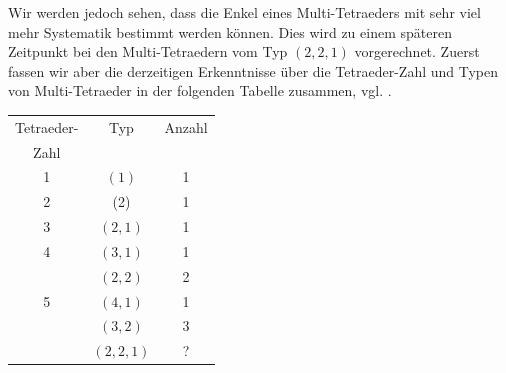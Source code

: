 \documentclass[12pt,titlepage,twoside,cleardoublepage]{article}
\theoremstyle{nummermitklammern}
\numberwithin{equation}{section}
\begin{document}
 Wir werden jedoch sehen, dass die Enkel eines Multi-Tetraeders mit sehr viel mehr Systematik bestimmt werden können. Dies wird zu einem späteren Zeitpunkt bei den Multi-Tetraedern vom Typ $(2,2,1)$ vorgerechnet. Zuerst fassen wir aber die derzeitigen Erkenntnisse über die Tetraeder-Zahl und Typen von Multi-Tetraeder in der folgenden Tabelle zusammen, vgl. \cite{simp}. 
\begin{center}
\begin{tabular}{|c|c|c|}
\hline
Tetraeder- & Typ & Anzahl\\
Zahl& &\\
\hline
1 &$(1)$ &1 \\
\hline
2 &(2) &1\\
\hline
3 &$(2,1)$ &1\\
\hline
4 &$(3,1)$ & 1 \\
 & $(2,2)$& 2\\
\hline
5 & $(4,1)$& 1\\
 &$(3,2)$ & 3\\
 & $(2,2,1)$& ?\\
\hline
\end{tabular}
\end{center}
\end{document}
